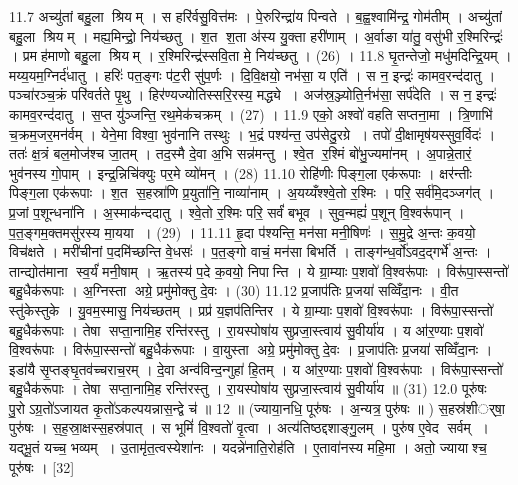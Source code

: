 11.7
अच्यु॑तां बहु॒ला श्रियम् । स हरि॑र्वसु॒वित्त॑मः । पे॒रुरिन्द्रा॑य पिन्वते । ब॒ह्व॒श्वामि॑न्द्र॒ गोम॑तीम् । अच्यु॑तां बहु॒ला श्रियम् । मह्य॒मिन्द्रो॒ निय॑च्छतु । श॒त श॒ता अ॑स्य यु॒क्ता हरी॑णाम् । अ॒र्वाङा या॑तु॒ वसु॑भी र॒श्मिरिन्द्रः॑ । प्रमह॑माणो बहु॒ला श्रियम् । र॒श्मिरिन्द्र॑स्सवि॒ता मे॒ निय॑च्छतु । (26) ।
11.8
घृ॒तन्तेजो॒ मधु॑मदिन्द्रि॒यम् । मय्य॒यम॒ग्निर्द॑धातु । हरिः॑ पत॒ङ्गः प॑ट॒री सु॑प॒र्णः । दि॒वि॒क्षयो॒ नभ॑सा॒ य एति॑ । स न॒ इन्द्रः॑ कामव॒रन्द॑दातु । पञ्चा॑रञ्च॒क्रं परि॑वर्तते पृ॒थु । हिर॑ण्यज्योतिस्सरि॒रस्य॒ मद्ध्ये । अज॑स्र॒ञ्ज्योति॒र्नभ॑सा॒ सर्प॑देति । स न॒ इन्द्रः॑ कामव॒रन्द॑दातु । स॒प्त यु॑ञ्जन्ति॒ रथ॒मेक॑चक्रम् । (27) ।
11.9
एको॒ अश्वो॑ वहति सप्तना॒मा । त्रि॒णाभि॑ च॒क्रम॒जर॒मन॑र्वम् । येने॒मा विश्वा॒ भुव॑नानि तस्थुः । भ॒द्रं पश्य॑न्त॒ उप॑सेदु॒रग्रे । तपो॑ दी॒क्षामृष॑यस्सुव॒र्विदः॑ । ततः॑ क्ष॒त्रं बल॒मोज॑श्च जा॒तम् । तद॒स्मै दे॒वा अ॒भि सन्न॑मन्तु । श्वे॒त र॒श्मिं बो॑भु॒ज्यमा॑नम् । अ॒पान्ने॒तारं॒ भुव॑नस्य गो॒पाम् । इन्द्र॒न्निचि॑क्युः पर॒मे व्यो॑मन् । (28)
11.10
रोहि॑णीः पिङ्ग॒ला एक॑रूपाः । क्षर॑न्तीः पिङ्ग॒ला एक॑रूपाः । श॒त स॒हस्रा॑णि प्र॒युता॑नि॒ नाव्या॑नाम् । अ॒यय्यँश्श्वे॒तो र॒श्मिः । परि॒ सर्व॑मि॒दञ्जग॑त् । प्र॒जां प॒शून्धना॑नि । अ॒स्माक॑न्ददातु । श्वे॒तो र॒श्मिः परि॒ सर्वं॑ बभूव । सुव॒न्मह्यं॑ प॒शून् वि॒श्वरू॑पान् । प॒त॒ङ्गम॒क्तमसु॑रस्य मा॒यया । (29) ।
11.11
हृ॒दा प॑श्यन्ति॒ मन॑सा मनी॒षिणः॑ । स॒मु॒द्रे अ॒न्तः क॒वयो॒ विच॑क्षते । मरी॑चीनां प॒दमि॑च्छन्ति वे॒धसः॑ । प॒त॒ङ्गो वाचं॒ मन॑सा बिभर्ति । ताङ्ग॑न्ध॒र्वो॑ऽवद॒द्गर्भे॑ अ॒न्तः । तान्द्योत॑माना स्व॒र्यं॑ मनी॒षाम् । ऋ॒तस्य॑ प॒दे क॒वयो॒ निपान्ति । ये ग्रा॒म्याः प॒शवो॑ वि॒श्वरू॑पाः । विरू॑पा॒स्सन्तो॑ बहु॒धैक॑रूपाः । अ॒ग्निस्ता अग्रे॒ प्रमु॑मोक्तु दे॒वः । (30)
11.12
प्र॒जाप॑तिः प्र॒जया॑ सव्विँदा॒नः । वी॒त स्तु॑केस्तुके । यु॒वम॒स्मासु॒ निय॑च्छतम् । प्रप्र॑ य॒ज्ञप॑तिन्तिर । ये ग्रा॒म्याः प॒शवो॑ वि॒श्वरू॑पाः । विरू॑पा॒स्सन्तो॑ बहु॒धैक॑रूपाः । तेषा सप्ता॒नामि॒ह रन्ति॑रस्तु । रा॒यस्पोषा॑य सुप्रजा॒स्त्वाय॑ सु॒वीर्या॑य । य आ॑र॒ण्याः प॒शवो॑ वि॒श्वरू॑पाः । विरू॑पा॒स्सन्तो॑ बहु॒धैक॑रूपाः । वा॒युस्ता अग्रे॒ प्रमु॑मोक्तु दे॒वः । प्र॒जाप॑तिः प्र॒जया॑ सव्विँदा॒नः । इडा॑यै सृ॒प्तङ्घृ॒तव॑च्चराच॒रम् । दे॒वा अन्व॑विन्द॒न्गुहा॑ हि॒तम् । य आ॑र॒ण्याः प॒शवो॑ वि॒श्वरू॑पाः । विरू॑पा॒स्सन्तो॑ बहु॒धैक॑रूपाः । तेषा सप्ता॒नामि॒ह रन्ति॑रस्तु । रा॒यस्पोषा॑य सुप्रजा॒स्त्वाय॑ सु॒वीर्या॑य ॥ (31)
12.0
पूरु॑षः पु॒रोऽग्र॒तो॑ऽजायत कृ॒तो॑ऽकल्पयन्नास॒न्द्वे च॑ ॥ 12 ॥ (ज्याया॒नधि॒ पूरु॑षः । अ॒न्यत्र॒ पुरु॑षः ॥ )
स॒हस्र॑शीर््षा॒ पुरु॑षः । स॒ह॒स्रा॒क्षस्स॒हस्र॑पात् । स भूमिं॑ वि॒श्वतो॑ वृ॒त्वा । अत्य॑तिष्ठद्दशाङ्गु॒लम् । पुरु॑ष ए॒वेद सर्वम् । यद्भू॒तं यच्च॒ भव्यम् । उ॒तामृ॑त॒त्वस्येशा॑नः । यदन्ने॑नाति॒रोह॑ति । ए॒तावा॑नस्य महि॒मा । अतो॒ ज्यायाश्च॒ पूरु॑षः । [32]
